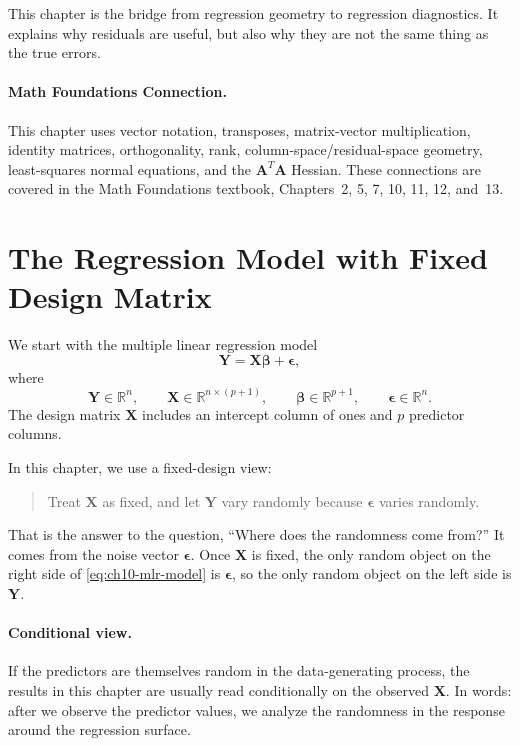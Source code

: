 This chapter is the bridge from regression geometry to regression diagnostics.  It explains why residuals are useful, but also why they are not the same thing as the true errors.

\paragraph{Math Foundations Connection.}
This chapter uses vector notation, transposes, matrix-vector multiplication, identity matrices, orthogonality, rank, column-space/residual-space geometry, least-squares normal equations, and the \(\mathbf{A}^T\mathbf{A}\) Hessian.  These connections are covered in the Math Foundations textbook, Chapters~2, 5, 7, 10, 11, 12, and~13.

\section{The Regression Model with Fixed Design Matrix}

We start with the multiple linear regression model
\begin{equation}
  \mathbf{Y}=\mathbf{X}\boldsymbol{\beta}+\boldsymbol{\epsilon},
  \label{eq:ch10-mlr-model}
\end{equation}
where
\begin{equation}
  \mathbf{Y}\in\mathbb{R}^{n},\qquad
  \mathbf{X}\in\mathbb{R}^{n\times(p+1)},\qquad
  \boldsymbol{\beta}\in\mathbb{R}^{p+1},\qquad
  \boldsymbol{\epsilon}\in\mathbb{R}^{n}.
\end{equation}
The design matrix \(\mathbf{X}\) includes an intercept column of ones and \(p\) predictor columns.

In this chapter, we use a fixed-design view:
\begin{quote}
  Treat \(\mathbf{X}\) as fixed, and let \(\mathbf{Y}\) vary randomly because \(\boldsymbol{\epsilon}\) varies randomly.
\end{quote}

That is the answer to the question, ``Where does the randomness come from?''  It comes from the noise vector \(\boldsymbol{\epsilon}\).  Once \(\mathbf{X}\) is fixed, the only random object on the right side of \eqref{eq:ch10-mlr-model} is \(\boldsymbol{\epsilon}\), so the only random object on the left side is \(\mathbf{Y}\).

\paragraph{Conditional view.}
If the predictors are themselves random in the data-generating process, the results in this chapter are usually read conditionally on the observed \(\mathbf{X}\).  In words: after we observe the predictor values, we analyze the randomness in the response around the regression surface.

